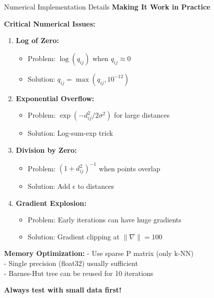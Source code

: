 \documentclass[10pt]{beamer}
\newcommand{\emphtext}[1]{\textcolor{upcblue}{\textbf{#1}}}
\newcommand{\warningbox}[1]{\colorbox{red!10}{\begin{minipage}{0.85\textwidth}\centering #1\end{minipage}}}
\begin{document}
\begin{frame}{Numerical Implementation Details}
\emphtext{Making It Work in Practice}

\vspace{0.3cm}
\textbf{Critical Numerical Issues:}

\begin{enumerate}
\footnotesize
\item \textbf{Log of Zero:}
   \begin{itemize}
   \tiny
   \item Problem: $\log(q_{ij})$ when $q_{ij} \approx 0$
   \item Solution: $q_{ij} = \max(q_{ij}, 10^{-12})$
   \end{itemize}

\item \textbf{Exponential Overflow:}
   \begin{itemize}
   \tiny
   \item Problem: $\exp(-d_{ij}^2/2\sigma^2)$ for large distances
   \item Solution: Log-sum-exp trick
   \end{itemize}

\item \textbf{Division by Zero:}
   \begin{itemize}
   \tiny
   \item Problem: $(1+d_{ij}^2)^{-1}$ when points overlap
   \item Solution: Add $\epsilon$ to distances
   \end{itemize}

\item \textbf{Gradient Explosion:}
   \begin{itemize}
   \tiny
   \item Problem: Early iterations can have huge gradients
   \item Solution: Gradient clipping at $\|\nabla\| = 100$
   \end{itemize}
\end{enumerate}

\vspace{0.3cm}
\textbf{Memory Optimization:}
\footnotesize
- Use sparse P matrix (only k-NN)\\
- Single precision (float32) usually sufficient\\
- Barnes-Hut tree can be reused for 10 iterations

\begin{center}
\warningbox{\footnotesize\textbf{Always test with small data first!}}
\end{center}
\end{frame}
\end{document}
